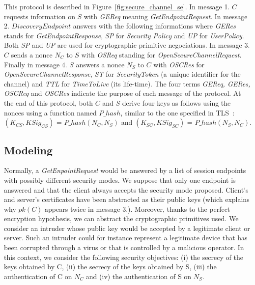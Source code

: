 This protocol is described in Figure~\ref{fig:secure_channel_se}.  In
message 1. $C$ requests information on $S$ with {\em GEReq} meaning
{\em GetEndpointRequest}.  In message 2. $DiscoveryEndpoint$ answers
with the following  informations where {\em GERes} stands for {\em
  GetEndpointResponse}, {\em SP} for {\em Security Policy} and {\em
  UP} for {\em UserPolicy}.  Both {\em SP} and {\em UP} are used for
cryptographic primitive negociations.  In message 3. $C$ sends a nonce
 $N_{C}$ to $S$ with {\em OSReq} standing for {\em
  OpenSecureChannelRequest}.  Finally in message 4. $S$ answers a
nonce $N_{S}$ to $C$ with {\em OSCRes} for {\em
  OpenSecureChannelResponse}, {\em ST} for {\em SecurityToken} (a
unique identifier for the channel) and {\em TTL} for {\em TimeToLive}
(its life-time).  The four terms {\em GEReq, GERes, OSCReq} and {\em
  OSCRes} indicate the purpose of each message of the protocol.  At
the end of this protocol, both $C$ and $S$ derive four keys as follows using the
nonces using a function named $P\_hash$, similar to the one specified
in TLS~\cite{DR08}: $(K_{CS}, KSig_{CS})$ = $P\_hash(N_{C}, N_{S})$
and $(K_{SC}, KSig_{SC})$ = $P\_hash(N_{S}, N_{C})$.

\subsection{Modeling}

Normally, a {\em GetEnpointRequest} would be answered by a list of
session endpoints with possibly different security modes. We suppose
that only one endpoint is answered and that the client  always
accepts the security mode proposed.
Client's and server's certificates have been abstracted as their public
keys (which explains why $pk(C)$ appears twice in message 3.).
Moreover, thanks to the perfect
encryption hypothesis, we can abstract the cryptographic primitives
used.  We consider an intruder whose public key would be accepted by a
legitimate client or server.  Such an intruder could for instance
represent a legitimate device that has been corrupted through a virus
or that is controlled by a malicious operator.
In this context, we consider the following security objectives: (i)
the secrecy of the keys obtained by C, (ii) the secrecy of the keys obtained
by S, (iii) the authentication of C on $N_{C}$ and (iv) the authentication of S
on $N_{S}$.

